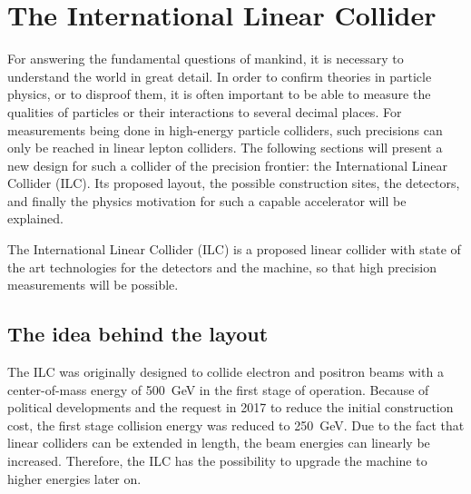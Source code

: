 \chapter{The International Linear Collider}
\label{ILC}
\begin{chapterabstract}
For answering the fundamental questions of mankind, it is necessary to understand the world in great detail.
In order to confirm theories in particle physics, or to disproof them, it is often important to be able to measure the qualities of particles or their interactions to several decimal places.
For measurements being done in high-energy particle colliders, such precisions can only be reached in linear lepton colliders.
The following sections will present a new design for such a collider of the precision frontier: the International Linear Collider (ILC). 
Its proposed layout, the possible construction sites, the detectors, and finally the physics motivation for such a capable accelerator will be explained.
\end{chapterabstract}
\newline

The International Linear Collider (ILC) is a proposed linear \positron\electron collider with state of the art technologies for the detectors and the machine, so that high precision measurements will be possible.

\section{The idea behind the layout}
\label{ILC:layout}
The ILC was originally designed to collide electron and positron beams with a center-of-mass energy of \SI{500}{\GeV} in the first stage of operation.
Because of political developments and the request in 2017 to reduce the initial construction cost, the first stage collision energy was reduced to \SI{250}{\GeV}.
Due to the fact that linear colliders can be extended in length, the beam energies can linearly be increased.
Therefore, the ILC has the possibility to upgrade the machine to higher energies later on.

